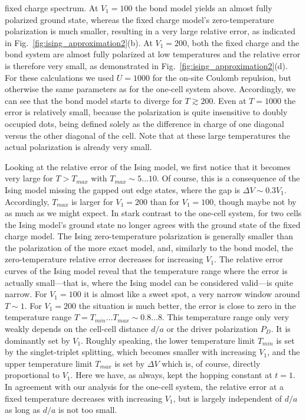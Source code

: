 fixed charge spectrum. At $V_1 = 100$ the bond model yields an almost fully
polarized ground state, whereas the fixed charge model's zero-temperature
polarization is much smaller, resulting in a very large relative error, as
indicated in Fig.~\ref{fig:ising_approximation2}(b). At $V_1 = 200$, both the
fixed charge and the bond system are almost fully polarized at low temperatures
and the relative error is therefore very small, as demonstrated in
Fig.~\ref{fig:ising_approximation2}(d). For these calculations we used $U=1000$
for the on-site Coulomb repulsion, but otherwise the same parameters as for the
one-cell system above. Accordingly, we can see that the bond model starts to
diverge for $T \gtrsim 200$. Even at $T=1000$ the error is relatively small,
because the polarization is quite insensitive to doubly occupied dots, being
defined solely as the difference in charge of one diagonal versus the other
diagonal of the cell. Note that at these large temperatures the actual
polarization is already very small.

Looking at the relative error of the Ising model, we first notice that it
becomes very large for $T > T_{max}$ with $T_{max} \sim 5 \ldots 10$. Of course,
this is a consequence of the Ising model missing the gapped out edge states,
where the gap is $\Delta V \sim 0.3 V_1$. Accordingly, $T_{max}$ is larger for
$V_1 = 200$ than for $V_1 = 100$, though maybe not by as much as we might
expect. In stark contrast to the one-cell system, for two cells the Ising
model's ground state no longer agrees with the ground state of the fixed charge
model. The Ising zero-temperature polarization is generally smaller than the
polarization of the more exact model, and, similarly to the bond model, the
zero-temperature relative error decreases for increasing $V_1$. The relative
error curves of the Ising model reveal that the temperature range where the
error is actually small---that is, where the Ising model can be considered
valid---is quite narrow. For $V_1 = 100$ it is almost like a sweet spot, a very
narrow window around $T \sim 1$. For $V_1 = 200$ the situation is much better,
the error is close to zero in the temperature range $T = T_{min} \ldots T_{max}
\sim 0.8 \ldots 8$. This temperature range only very weakly depends on the
cell-cell distance $d/a$ or the driver polarization $P_D$. It is dominantly set
by $V_1$.  Roughly speaking, the lower temperature limit $T_{min}$ is set by the
singlet-triplet splitting, which becomes smaller with increasing $V_1$, and the
upper temperature limit $T_{max}$ is set by $\Delta V$ which is, of course,
directly proportional to $V_1$. Here we have, as always, kept the hopping
constant at $t=1$. In agreement with our analysis for the one-cell system, the
relative error at a fixed temperature decreases with increasing $V_1$, but is
largely independent of $d/a$ as long as $d/a$ is not too small.

